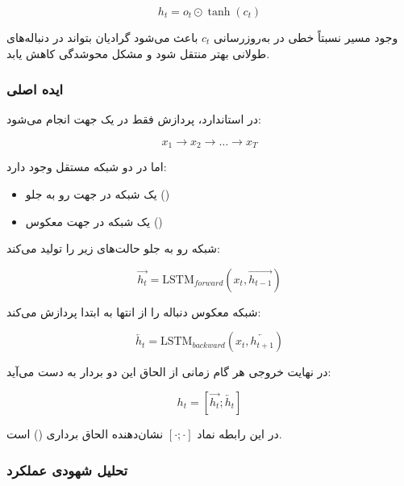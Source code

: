 \documentclass{article}
\begin{document}
\begin{equation}
	h_t = o_t \odot \tanh(c_t)
\end{equation}

وجود مسیر نسبتاً خطی در به‌روزرسانی \( c_t \) باعث می‌شود گرادیان بتواند در دنباله‌های طولانی بهتر منتقل شود و مشکل محوشدگی کاهش یابد.

\subsubsection{ایده اصلی }

در  استاندارد، پردازش فقط در یک جهت انجام می‌شود:

\begin{equation}
	x_1 \rightarrow x_2 \rightarrow \dots \rightarrow x_T
\end{equation}

اما در  دو شبکه  مستقل وجود دارد:

\begin{itemize}
	\item یک شبکه در جهت رو به جلو ()
	\item یک شبکه در جهت معکوس ()
\end{itemize}

شبکه رو به جلو حالت‌های زیر را تولید می‌کند:

\begin{equation}
	\overrightarrow{h_t} = \text{LSTM}_{forward}(x_t, \overrightarrow{h_{t-1}})
\end{equation}

شبکه معکوس دنباله را از انتها به ابتدا پردازش می‌کند:

\begin{equation}
	\overleftarrow{h_t} = \text{LSTM}_{backward}(x_t, \overleftarrow{h_{t+1}})
\end{equation}

در نهایت خروجی هر گام زمانی از الحاق این دو بردار به دست می‌آید:

\begin{equation}
	h_t = [\overrightarrow{h_t} ; \overleftarrow{h_t}]
\end{equation}

در این رابطه نماد \( [\cdot ; \cdot] \) نشان‌دهنده الحاق برداری () است.

\subsubsection{تحلیل شهودی عملکرد}
\end{document}
